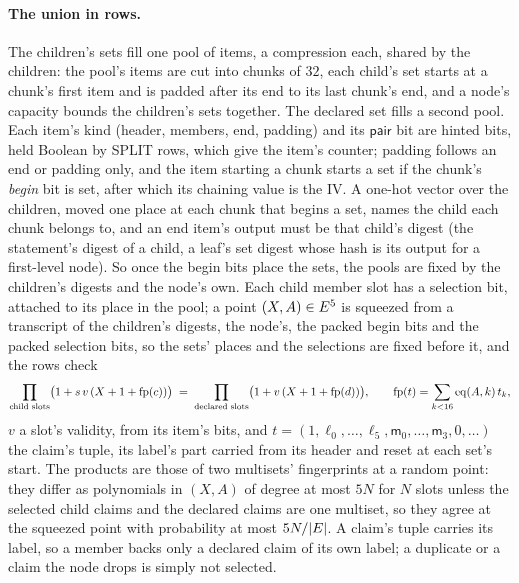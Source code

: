 \paragraph{The union in rows.} The children's sets fill one pool of items, a compression each, shared by the children: the pool's items are cut into chunks of $32$, each child's set starts at a chunk's first item and is padded after its end to its last chunk's end, and a node's capacity bounds the children's sets together. The declared set fills a second pool. Each item's kind (header, members, end, padding) and its $\mathsf{pair}$ bit are hinted bits, held Boolean by \textsf{SPLIT} rows, which give the item's counter; padding follows an end or padding only, and the item starting a chunk starts a set if the chunk's \emph{begin} bit is set, after which its chaining value is the IV. A one-hot vector over the children, moved one place at each chunk that begins a set, names the child each chunk belongs to, and an end item's output must be that child's digest (the statement's digest of a child, a leaf's set digest whose hash is its output for a first-level node). So once the begin bits place the sets, the pools are fixed by the children's digests and the node's own. Each child member slot has a selection bit, attached to its place in the pool; a point $(X,A)\in E^5$ is squeezed from a transcript of the children's digests, the node's, the packed begin bits and the packed selection bits, so the sets' places and the selections are fixed before it, and the rows check
\[
  \prod_{\text{child slots}}\bigl(1+s\,v\,(X+1+\mathrm{fp}(c))\bigr)\;=\;\prod_{\text{declared slots}}\bigl(1+v\,(X+1+\mathrm{fp}(d))\bigr),\qquad \mathrm{fp}(t)=\sum_{k<16}\operatorname{eq}(A,k)\,t_k,
\]
$v$ a slot's validity, from its item's bits, and $t=(1,\ell_0,\dots,\ell_5,\mathsf{m}_0,\dots,\mathsf{m}_3,0,\dots)$ the claim's tuple, its label's part carried from its header and reset at each set's start. The products are those of two multisets' fingerprints at a random point: they differ as polynomials in $(X,A)$ of degree at most $5N$ for $N$ slots unless the selected child claims and the declared claims are one multiset, so they agree at the squeezed point with probability at most $5N/|E|$. A claim's tuple carries its label, so a member backs only a declared claim of its own label; a duplicate or a claim the node drops is simply not selected.

